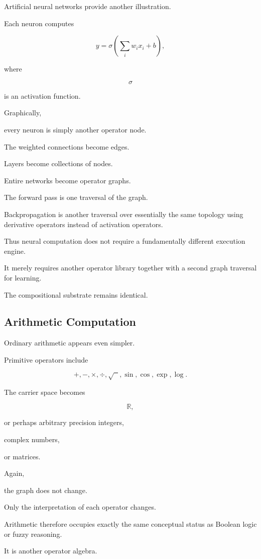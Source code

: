 \documentclass[12pt,oneside]{article}
\begin{document}
Artificial neural networks provide another illustration.

Each neuron computes

\[
y
=
\sigma
\left(
\sum_i
w_i x_i+b
\right),
\]

where

\[
\sigma
\]

is an activation function.

Graphically,

every neuron is simply another operator node.

The weighted connections become edges.

Layers become collections of nodes.

Entire networks become operator graphs.

The forward pass is one traversal of the graph.

Backpropagation is another traversal over essentially the same topology using derivative operators instead of activation operators.

Thus neural computation does not require a fundamentally different execution engine.

It merely requires another operator library together with a second graph traversal for learning.

The compositional substrate remains identical.

\subsection{Arithmetic Computation}

Ordinary arithmetic appears even simpler.

Primitive operators include

\[
+,
-,
\times,
\div,
\sqrt{\phantom{x}},
\sin,
\cos,
\exp,
\log.
\]

The carrier space becomes

\[
\mathbb R,
\]

or perhaps arbitrary precision integers,

complex numbers,

or matrices.

Again,

the graph does not change.

Only the interpretation of each operator changes.

Arithmetic therefore occupies exactly the same conceptual status as Boolean logic or fuzzy reasoning.

It is another operator algebra.
\end{document}
